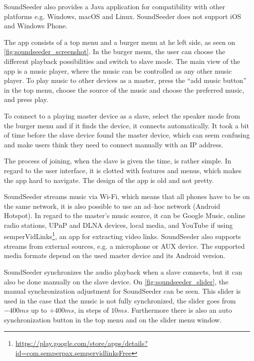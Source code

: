 SoundSeeder also provides a Java application for compatibility with other platforms e.g. Windows, macOS and Linux.
SoundSeeder does not support iOS and Windows Phone\cite{soundseeder_ios}.

The app consists of a top menu and a burger menu at he left side, as seen on \cref{fig:soundseeder_screenshot}.
In the burger menu, the user can choose the different playback possibilities and switch to slave mode.
The main view of the app is a music player, where the music can be controlled as any other music player.
To play music to other devices as a master, press the ``add music button'' in the top menu,
choose the source of the music and choose the preferred music, and press play.

To connect to a playing master device as a slave, select the speaker mode from the burger menu and if it finds the device, it connects automatically.
It took a bit of time before the slave device found the master device, which can seem confusing and make users think they need to connect manually with an IP address.

The process of joining, when the slave is given the time, is rather simple.
In regard to the user interface, it is clotted with features and menus, which makes the app hard to navigate.
The design of the app is old and not pretty.

SoundSeeder streams music via Wi-Fi,
which means that all phones have to be on the same network\cite{soundseether_faq}, it is also possible to use an ad--hoc network (Android Hotspot).
In regard to the master's music source, it can be Google Music, online radio stations, UPnP and DLNA devices, local media, and YouTube if using semperVidLinks\footnote{\url{https://play.google.com/store/apps/details?id=com.semperpax.sempervidlinksFree}}, an app for extracting video links.
SoundSeeder also supports streams from external sources, e.g. a microphone or AUX device.
The supported media formats depend on the used master device and its Android version.\cite{soundseether_faq}

SoundSeeder synchronizes the audio playback when a slave connects, but it can also be done manually on the slave device.
On \cref{fig:soundseeder_slider}, the manual synchronization adjustment for SoundSeeder can be seen.
This slider is used in the case that the music is not fully synchronized, the slider goes from $-400 ms$ up to $+400 ms$, in steps of $10 ms$.
Furthermore there is also an auto synchronization button in the top menu and on the slider menu window.

